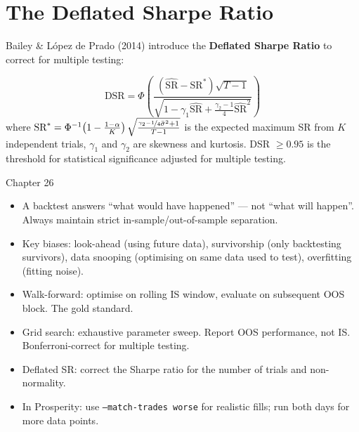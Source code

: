 \documentclass[12pt,a4paper,openany]{report}
\theoremstyle{definition}
\begin{document}
\section{The Deflated Sharpe Ratio}

Bailey \& L\'{o}pez de Prado (2014) introduce the \textbf{Deflated Sharpe Ratio} to correct for multiple testing:

\begin{equation}
  \text{DSR} = \Phi\!\left(\frac{(\widehat{\text{SR}} - \text{SR}^*)\sqrt{T-1}}{\sqrt{1 - \gamma_1\widehat{\text{SR}} + \frac{\gamma_2-1}{4}\widehat{\text{SR}}^2}}\right)
\end{equation}
where $\text{SR}^* = \Phi^{-1}\!\left(1 - \frac{1-\alpha}{K}\right)\sqrt{\frac{\nicefrac{\gamma_2-1}{4}\bar{\sigma}^2 + 1}{T-1}}$ is the expected maximum SR from $K$ independent trials, $\gamma_1$ and $\gamma_2$ are skewness and kurtosis. DSR $\geq 0.95$ is the threshold for statistical significance adjusted for multiple testing.

\begin{takeawaybox}{Chapter 26}
\begin{itemize}
  \item A backtest answers ``what would have happened'' — not ``what will happen''. Always maintain strict in-sample/out-of-sample separation.
  \item Key biases: look-ahead (using future data), survivorship (only backtesting survivors), data snooping (optimising on same data used to test), overfitting (fitting noise).
  \item Walk-forward: optimise on rolling IS window, evaluate on subsequent OOS block. The gold standard.
  \item Grid search: exhaustive parameter sweep. Report OOS performance, not IS. Bonferroni-correct for multiple testing.
  \item Deflated SR: correct the Sharpe ratio for the number of trials and non-normality.
  \item In Prosperity: use \texttt{--match-trades worse} for realistic fills; run both days for more data points.
\end{itemize}
\end{takeawaybox}
\end{document}
